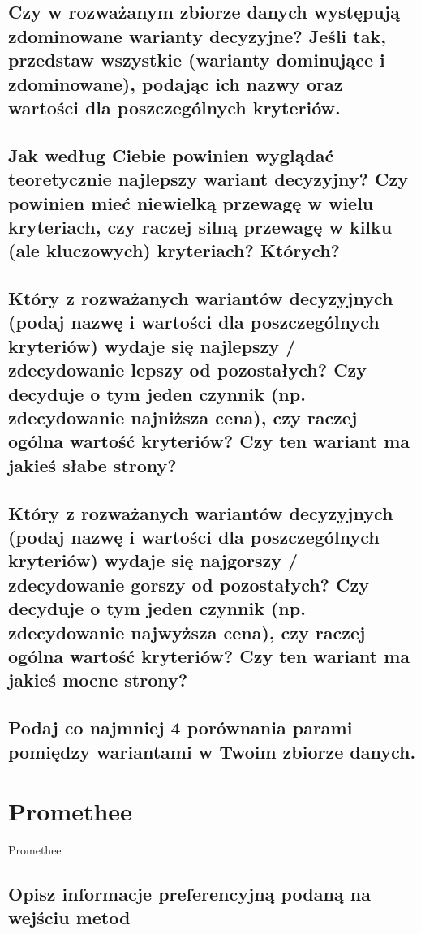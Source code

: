 \documentclass[11pt]{article}
\begin{document}
\subsection{Czy w rozważanym zbiorze danych występują zdominowane warianty decyzyjne? Jeśli tak, przedstaw wszystkie (warianty dominujące i zdominowane), podając ich nazwy oraz wartości dla poszczególnych kryteriów.}

\subsection{Jak według Ciebie powinien wyglądać teoretycznie najlepszy wariant decyzyjny? Czy powinien mieć niewielką przewagę w wielu kryteriach, czy raczej silną przewagę w kilku (ale kluczowych) kryteriach? Których?}

\subsection{Który z rozważanych wariantów decyzyjnych (podaj nazwę i wartości dla poszczególnych kryteriów) wydaje się najlepszy / zdecydowanie lepszy od pozostałych? Czy decyduje o tym jeden czynnik (np. zdecydowanie najniższa cena), czy raczej ogólna wartość kryteriów? Czy ten wariant ma jakieś słabe strony?}

\subsection{Który z rozważanych wariantów decyzyjnych (podaj nazwę i wartości dla poszczególnych kryteriów) wydaje się najgorszy / zdecydowanie gorszy od pozostałych? Czy decyduje o tym jeden czynnik (np. zdecydowanie najwyższa cena), czy raczej ogólna wartość kryteriów? Czy ten wariant ma jakieś mocne strony?}

\subsection{Podaj co najmniej 4 porównania parami pomiędzy wariantami w Twoim zbiorze danych.}

\section{Promethee}
Promethee
\subsection{Opisz informacje preferencyjną podaną na wejściu metod}
\end{document}
